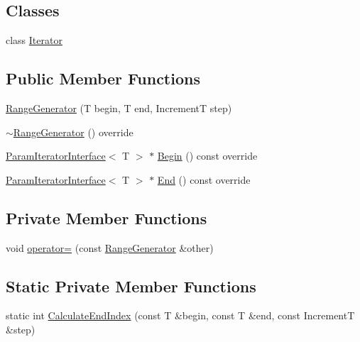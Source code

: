 \subsection*{Classes}
\begin{DoxyCompactItemize}
\item 
class \hyperlink{classtesting_1_1internal_1_1RangeGenerator_1_1Iterator}{Iterator}
\end{DoxyCompactItemize}
\subsection*{Public Member Functions}
\begin{DoxyCompactItemize}
\item 
\hyperlink{classtesting_1_1internal_1_1RangeGenerator_a5b3b83223b9cada3569bcee729e0fdf3}{Range\+Generator} (T begin, T end, IncrementT step)
\item 
\hyperlink{classtesting_1_1internal_1_1RangeGenerator_a72f6e6f65f1dd3f86672f6ed47df74ef}{$\sim$\+Range\+Generator} () override
\item 
\hyperlink{classtesting_1_1internal_1_1ParamIteratorInterface}{Param\+Iterator\+Interface}$<$ T $>$ $\ast$ \hyperlink{classtesting_1_1internal_1_1RangeGenerator_a502913fbcf14e89d5765dfb44f3c1295}{Begin} () const override
\item 
\hyperlink{classtesting_1_1internal_1_1ParamIteratorInterface}{Param\+Iterator\+Interface}$<$ T $>$ $\ast$ \hyperlink{classtesting_1_1internal_1_1RangeGenerator_ac112ca69567b9c47bf14554e0473e1e2}{End} () const override
\end{DoxyCompactItemize}
\subsection*{Private Member Functions}
\begin{DoxyCompactItemize}
\item 
void \hyperlink{classtesting_1_1internal_1_1RangeGenerator_a00ef0f268e44d48d129a52bf0f9f9539}{operator=} (const \hyperlink{classtesting_1_1internal_1_1RangeGenerator}{Range\+Generator} \&other)
\end{DoxyCompactItemize}
\subsection*{Static Private Member Functions}
\begin{DoxyCompactItemize}
\item 
static int \hyperlink{classtesting_1_1internal_1_1RangeGenerator_af617ad3b3e40bef967f1055dc7ae8ae6}{Calculate\+End\+Index} (const T \&begin, const T \&end, const IncrementT \&step)
\end{DoxyCompactItemize}
